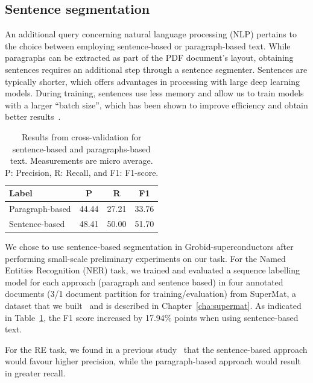 \subsection{Sentence segmentation}
An additional query concerning natural language processing (NLP) pertains to the choice between employing sentence-based or paragraph-based text.
While paragraphs can be extracted as part of the PDF document's layout, obtaining sentences requires an additional step through a sentence segmenter. Sentences are typically shorter, which offers advantages in processing with large deep learning models.
During training, sentences use less memory and allow us to train models with a larger ``batch size'', which has been shown to improve efficiency and obtain better results~\cite{liu2019roberta}. 

\begin{table}[ht]
    \centering
    \caption{Results from cross-validation for sentence-based and paragraphs-based text. Measurements are micro average. P: Precision, R: Recall, and F1: F1-score.}
    
    \begin{tabular}{lccc}
        \toprule
        \textbf{Label}   & \textbf{P}   & \textbf{R}    & \textbf{F1} \\
        \midrule
        Paragraph-based  & 44.44        & 27.21         & 33.76       \\
        Sentence-based   & 48.41        & 50.00         & 51.70       \\
        \bottomrule
    \end{tabular}

    \label{tab:comparison-evaluation-sentences-paragraphs}
\end{table}

We chose to use sentence-based segmentation in Grobid-superconductors after performing small-scale preliminary experiments on our task. 
For the Named Entities Recognition (NER) task, we trained and evaluated a sequence labelling model for each approach (paragraph and sentence based) in four annotated documents (3/1 document partition for training/evaluation) from SuperMat, a dataset that we built~\cite{foppiano2021supermat} and is described in Chapter~\ref{cha:supermat}.
As indicated in Table~\ref{tab:comparison-evaluation-sentences-paragraphs}, the F1 score increased by 17.94\% points when using sentence-based text.

For the RE task, we found in a previous study~\cite{foppiano2019proposal} that the sentence-based approach would favour higher precision, while the paragraph-based approach would result in greater recall.

